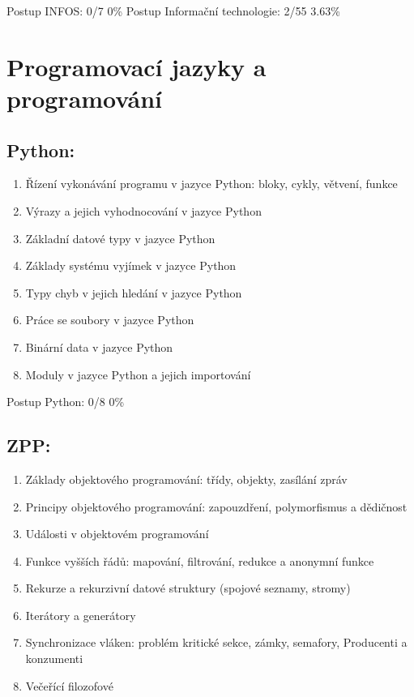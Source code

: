 \documentclass{article}
\begin{document}
	Postup INFOS: 0/7 0\%
	\newline
	\newline
	Postup Informační technologie: 2/55 3.63\%
	
	
	\section*{Programovací jazyky a programování}
	
	\subsection*{Python:}
	
	\begin{enumerate}[label=\arabic*.]
		\item Řízení vykonávání programu v jazyce Python: bloky, cykly, větvení, funkce
		\item Výrazy a jejich vyhodnocování v jazyce Python
		\item Základní datové typy v jazyce Python
		\item Základy systému vyjímek v jazyce Python
		\item Typy chyb v jejich hledání v jazyce Python
		\item Práce se soubory v jazyce Python
		\item Binární data v jazyce Python
		\item Moduly v jazyce Python a jejich importování
	\end{enumerate}
	
	Postup Python: 0/8 0\%
	
	\subsection*{ZPP:}
	
	\begin{enumerate}[label=\arabic*.]
		\item Základy objektového programování: třídy, objekty, zasílání zpráv
		\item Principy objektového programování: zapouzdření, polymorfismus a dědičnost
		\item Události v objektovém programování
		\item Funkce vyšších řádů: mapování, filtrování, redukce a anonymní funkce
		\item Rekurze a rekurzivní datové struktury (spojové seznamy, stromy)
		\item Iterátory a generátory
		\item Synchronizace vláken: problém kritické sekce, zámky, semafory, Producenti a konzumenti
		\item Večeřící filozofové
	\end{enumerate}
	
\end{document}
